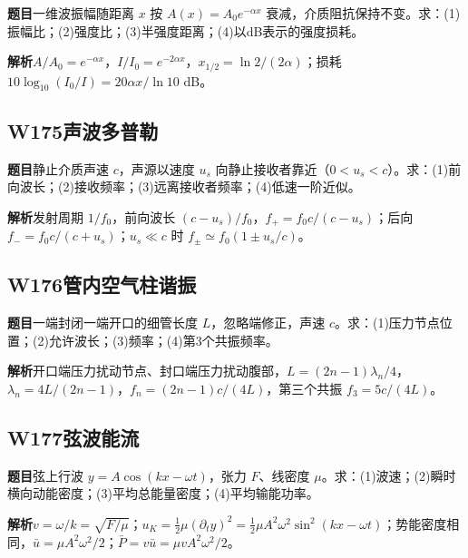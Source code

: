 \textbf{题目}\quad 一维波振幅随距离 $x$ 按 $A(x)=A_0e^{-\alpha x}$ 衰减，介质阻抗保持不变。求：(1)振幅比；(2)强度比；(3)半强度距离；(4)以dB表示的强度损耗。

\par\textbf{解析}\quad $A/A_0=e^{-\alpha x}$，$I/I_0=e^{-2\alpha x}$，$x_{1/2}=\ln2/(2\alpha)$；损耗 $10\log_{10}(I_0/I)=20\alpha x/\ln10$ dB。

\par\medskip

\subsection*{W175\quad 声波多普勒}

\textbf{题目}\quad 静止介质声速 $c$，声源以速度 $u_s$ 向静止接收者靠近（$0<u_s<c$）。求：(1)前向波长；(2)接收频率；(3)远离接收者频率；(4)低速一阶近似。

\par\textbf{解析}\quad 发射周期 $1/f_0$，前向波长 $(c-u_s)/f_0$，$f_+=f_0c/(c-u_s)$；后向 $f_-=f_0c/(c+u_s)$；$u_s\ll c$ 时 $f_\pm\simeq f_0(1\pm u_s/c)$。

\par\medskip

\subsection*{W176\quad 管内空气柱谐振}

\textbf{题目}\quad 一端封闭一端开口的细管长度 $L$，忽略端修正，声速 $c$。求：(1)压力节点位置；(2)允许波长；(3)频率；(4)第3个共振频率。

\par\textbf{解析}\quad 开口端压力扰动节点、封口端压力扰动腹部，$L=(2n-1)\lambda_n/4$，$\lambda_n=4L/(2n-1)$，$f_n=(2n-1)c/(4L)$，第三个共振 $f_3=5c/(4L)$。

\par\medskip

\subsection*{W177\quad 弦波能流}

\textbf{题目}\quad 弦上行波 $y=A\cos(kx-\omega t)$，张力 $F$、线密度 $\mu$。求：(1)波速；(2)瞬时横向动能密度；(3)平均总能量密度；(4)平均输能功率。

\par\textbf{解析}\quad $v=\omega/k=\sqrt{F/\mu}$；$u_K=\tfrac12\mu(\partial_ty)^2=\tfrac12\mu A^2\omega^2\sin^2(kx-\omega t)$；势能密度相同，$\bar u=\mu A^2\omega^2/2$；$\bar P=v\bar u=\mu vA^2\omega^2/2$。

